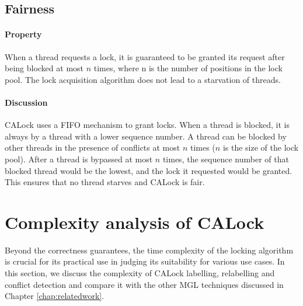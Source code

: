 \subsection[Fairness]{Fairness}
\paragraph{Property} When a thread requests a lock, it is guaranteed to be granted its request after being blocked at most $\mathit{n}$ times, where n is the number of positions in the lock pool. 
The lock acquisition algorithm does not lead to a starvation of threads.

\paragraph{Discussion}
CALock uses a FIFO mechanism to grant locks. When a thread is blocked, it is always by a thread with a lower sequence number.
A thread can be blocked by other threads in the presence of conflicts at most $n$ times ($n$ is the size of the lock pool).  
After a thread is bypassed at most $n$ times, the sequence number of that blocked thread would be the lowest, and the lock it requested would be granted. 
This ensures that no thread starves and CALock is fair.


\section{Complexity analysis of CALock} \label{complexityAnalysis}

Beyond the correctness guarantees, the time complexity of the locking algorithm is crucial for its practical use in judging its suitability for various use cases. In this section, we discuss the complexity of CALock labelling, relabelling and conflict detection and compare it with the other MGL techniques discussed in Chapter \ref{chap:relatedwork}.

